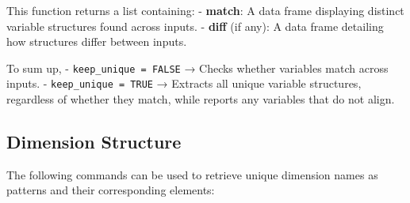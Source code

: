 \documentclass[
]{article}
\newenvironment{Shaded}{\begin{snugshade}}{\end{snugshade}}
\newcommand{\AttributeTok}[1]{\textcolor[rgb]{0.13,0.29,0.53}{#1}}
\newcommand{\CommentTok}[1]{\textcolor[rgb]{0.56,0.35,0.01}{\textit{#1}}}
\newcommand{\ConstantTok}[1]{\textcolor[rgb]{0.56,0.35,0.01}{#1}}
\newcommand{\DecValTok}[1]{\textcolor[rgb]{0.00,0.00,0.81}{#1}}
\newcommand{\FunctionTok}[1]{\textcolor[rgb]{0.13,0.29,0.53}{\textbf{#1}}}
\newcommand{\NormalTok}[1]{#1}
\newcommand{\OtherTok}[1]{\textcolor[rgb]{0.56,0.35,0.01}{#1}}
\newcommand{\SpecialCharTok}[1]{\textcolor[rgb]{0.81,0.36,0.00}{\textbf{#1}}}
\begin{document}
\begin{Shaded}
\end{Shaded}

This function returns a list containing: - \textbf{match}: A data frame
displaying distinct variable structures found across inputs. -
\textbf{diff} (if any): A data frame detailing how structures differ
between inputs.

To sum up, - \texttt{keep\_unique\ =\ FALSE} → Checks whether variables
match across inputs. - \texttt{keep\_unique\ =\ TRUE} → Extracts all
unique variable structures, regardless of whether they match, while
reports any variables that do not align.

\subsection{Dimension Structure}\label{dimension-structure}

The following commands can be used to retrieve unique dimension names as
patterns and their corresponding elements:
\end{document}
